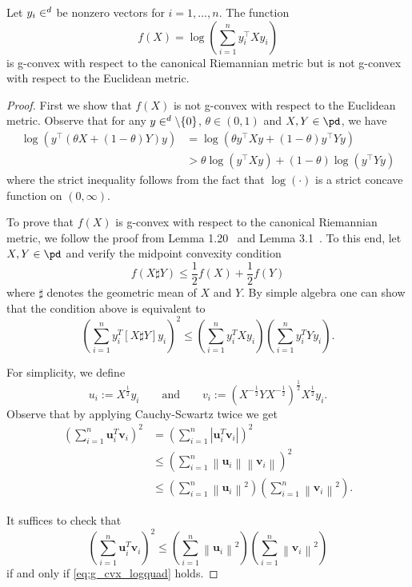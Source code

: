 \documentclass[twoside,11pt]{article}
\begin{document}
\begin{prop}\label{prop:log_quad_gcvx}
    Let $y_i \in \real^d$ be nonzero vectors for $i = 1, \ldots, n$. The function 
    \[
    f(X) = \log \left(\sum_{i=1}^n y_i^\top X y_i  \right)
    \]
    is g-convex with respect to the canonical Riemannian metric but is not g-convex with respect to the Euclidean metric.
\end{prop}
\begin{proof}
    First we show that $f(X)$ is not g-convex with respect to the Euclidean metric. Observe that for any $y \in \real^d \setminus \{0\}$,  $\theta \in (0,1)$ and $X, Y \in \pd$, we have
    \[
    \begin{aligned}
        \log \left(y^\top \left(\theta X + (1-\theta)Y\right) y \right) &= \log \left(\theta y^\top X y + (1-\theta)y^\top Y y\right) 
        \\&> \theta \log \left(y^\top X y\right) + (1- \theta) \log \left(y^\top Y y \right)
    \end{aligned}
    \]
    where the strict inequality follows from the fact that $\log(\cdot)$ is a strict concave function on $(0, \infty)$. 

    To prove that $f(X)$ is g-convex with respect to the canonical Riemannian metric, we follow the proof from Lemma 1.20~\citep{wieselstructuredcovariance} and Lemma 3.1~\citep{zhang2016robust}. To this end, let $X,Y \in \pd$ and verify the midpoint convexity condition
    \[
    f(X \sharp Y) \leq \frac{1}{2}f(X) + \frac{1}{2}f(Y)
    \]
    where $\sharp$ denotes the geometric mean of $X$ and $Y$. By simple algebra one can show that the condition above is equivalent to 
    \begin{equation}\label{eq:g_cvx_logquad}
        \left(\sum_{i=1}^n {y}_i^T[X \sharp Y] {y}_i\right)^2 \leq\left(\sum_{i=1}^n y_i^T X {y}_i\right)\left(\sum_{i=1}^n y_i^T Y {y}_i\right).
    \end{equation}
    
    For simplicity, we define 
    \[
    u_i := X^{\frac{1}{2}}y_i \qquad \text{and} \qquad v_i := \left(X^{-\frac{1}{2}}Y X^{-\frac{1}{2}}\right)^{\frac{1}{2}}X^{\frac{1}{2}}y_i.
    \]
    Observe that by applying Cauchy-Scwartz twice we get
    \[
    \begin{aligned}
\left(\sum_{i=1}^n \mathbf{u}_i^T \mathbf{v}_i\right)^2 & =\left(\sum_{i=1}^n\left|\mathbf{u}_i^T \mathbf{v}_i\right|\right)^2 \\
& \leq\left(\sum_{i=1}^n\left\|\mathbf{u}_i\right\|\left\|\mathbf{v}_i\right\|\right)^2 \\
& \leq\left(\sum_{i=1}^n\left\|\mathbf{u}_i\right\|^2\right)\left(\sum_{i=1}^n\left\|\mathbf{v}_i\right\|^2\right).
\end{aligned}
\]

It suffices to check that 
\[
\left(\sum_{i=1}^n \mathbf{u}_i^T \mathbf{v}_i\right)^2 \leq\left(\sum_{i=1}^n\left\|\mathbf{u}_i\right\|^2\right)\left(\sum_{i=1}^n\left\|\mathbf{v}_i\right\|^2\right)
\]
if and only if \eqref{eq:g_cvx_logquad} holds.
\end{proof}
\end{document}
